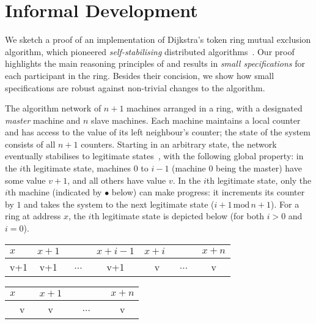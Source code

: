 \section{Informal Development}
\label{sec:intuition}

We sketch a proof of an implementation of Dijkstra's token ring mutual
exclusion algorithm, which pioneered \emph{self-stabilising}
distributed algorithms~\cite{dijkstra74}. Our proof highlights the main
reasoning principles of \colosl and results in \emph{small
  specifications} for each participant in the ring. Besides their
concision, we show how small specifications are robust against
non-trivial changes to the algorithm.

The algorithm %
network of $n{+}1$ machines arranged in a ring, with a designated
\emph{master} machine and $n$ slave machines. Each machine maintains a
local counter and has access to the value of its left neighbour's
counter; the state of the system consists of all $n{+}1$
counters. Starting in an arbitrary state, the network eventually
stabilises to legitimate states~\cite{dijkstra-proof}, with the
following global property: in the $i$th legitimate state, machines
$0$ to $i{-}1$ (machine $0$ being the master) have some
value $v{+}1$, and all others have value
$v$.  In the $i$th legitimate state, only the $i$th machine (indicated
by $\bullet$ below) can make
progress: it increments its counter by $1$ and takes the system to the
next legitimate state ($i{+}1 \,\text{mod}\, n{+}1$). For a ring at
address $x$, the $i$th legitimate state is depicted below (for both
$i>0$ and $i=0$).  \\ \null\hfill
  \begin{tabular}{lllllll}
    $x$&$x{+}1$&&$x{+}i{-}1$&$x{+}i$&&$x{+}n$
    \\
    \hline
    \multicolumn{1}{|c|}{v+1} &
    \multicolumn{1}{|c|}{v+1} &
    \multicolumn{1}{|c|}{~$\cdots$~} &
    \multicolumn{1}{|c|}{v+1} &
    \multicolumn{1}{|c|}{~~v~\raisebox{1ex}{$\bullet$}} &
    \multicolumn{1}{|c|}{~$\cdots$~} &
    \multicolumn{1}{|c|}{v}\\
    \hline
  \end{tabular}\hfill
  \begin{tabular}{lllllll}
    $x$&$x{+}1$&&&&&$x{+}n$\\
    \hline
    \multicolumn{1}{|c|}{~~v~\raisebox{1ex}{$\bullet$}} &
    \multicolumn{1}{|c|}{v} &
    \multicolumn{4}{|c|}{~$\cdots$~} &
    \multicolumn{1}{|c|}{v}\\
    \hline
  \end{tabular}
  \hfill\null\\


